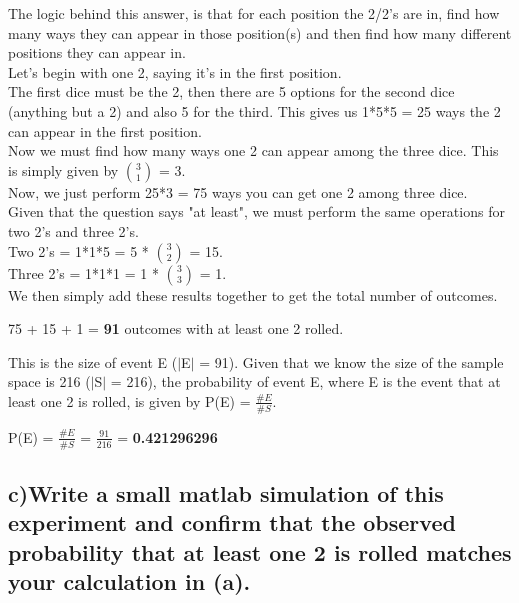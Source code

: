 \documentclass{report}
\begin{document}
		The logic behind this answer, is that for each position the 2/2's are in, find how many ways they can appear in those position(s) and then find how many different positions they can appear in.\\
		Let's begin with one 2, saying it's in the first position.\\
		The first dice must be the 2, then there are 5 options for the second dice (anything but a 2) and also 5 for the third. This gives us 1*5*5 = 25 ways the 2 can appear in the first position.\\
		Now we must find how many ways one 2 can appear among the three dice. This is simply given by ${3 \choose 1}$ = 3.\\
		Now, we just perform 25*3 = 75 ways you can get one 2 among three dice.\\
		Given that the question says "at least", we must perform the same operations for two 2's and three 2's.\\
		Two 2's = 1*1*5 = 5 * ${3 \choose 2}$ = 15.\\
		Three 2's = 1*1*1 = 1 * ${3 \choose 3}$ = 1.\\
		We then simply add these results together to get the total number of outcomes.
		\begin{center}
			75 + 15 + 1 = \textbf{91} outcomes with at least one 2 rolled.\\
		\end{center}
		This is the size of event E ($\vert$E$\vert$ = 91). Given that we know the size of the sample space is 216 ($\vert$S$\vert$ = 216), the probability of event E, where E is the event that at least one 2 is rolled, is given by P(E) = $\frac{\#E}{\#S}$.
		\begin{center}
			P(E) = $\frac{\#E}{\#S}$ = $\frac{91}{216}$ = \textbf{0.421296296}
		\end{center}
		
			
		\subsection*{c)Write a small matlab simulation of this experiment and confirm that the observed probability that at least one 2 is rolled matches your calculation in (a).}
		
\end{document}
